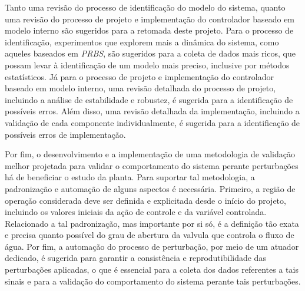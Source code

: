 \documentclass[conference,harvard,brazil,english]{sbatex}
\begin{document}
Tanto uma revisão do processo de identificação do modelo do sistema, quanto uma revisão do processo de projeto e implementação do controlador baseado em modelo interno são sugeridos para a retomada deste projeto. Para o processo de identificação, experimentos que explorem mais a dinâmica do sistema, como aqueles baseados em \textit{PRBS}, são sugeridos para a coleta de dados mais ricos, que possam levar à identificação de um modelo mais preciso, inclusive por métodos estatísticos. Já para o processo de projeto e implementação do controlador baseado em modelo interno, uma revisão detalhada do processo de projeto, incluindo a análise de estabilidade e robustez, é sugerida para a identificação de possíveis erros. Além disso, uma revisão detalhada da implementação, incluindo a validação de cada componente individualmente, é sugerida para a identificação de possíveis erros de implementação.

Por fim, o desenvolvimento e a implementação de uma metodologia de validação melhor projetada para validar o comportamento do sistema perante perturbações há de beneficiar o estudo da planta. Para suportar tal metodologia, a padronização e automação de alguns aspectos é necessária. Primeiro, a região de operação considerada deve ser definida e explicitada desde o início do projeto, incluindo os valores iniciais da ação de controle e da variável controlada. Relacionado a tal padronização, mas importante por si só, é a definição tão exata e precisa quanto possível do grau de abertura da valvula que controla o fluxo de água. Por fim, a automação do processo de perturbação, por meio de um atuador dedicado, é sugerida para garantir a consistência e reprodutibilidade das perturbações aplicadas, o que é essencial para a coleta dos dados referentes a tais sinais e para a validação do comportamento do sistema perante tais perturbações.


\end{document}
